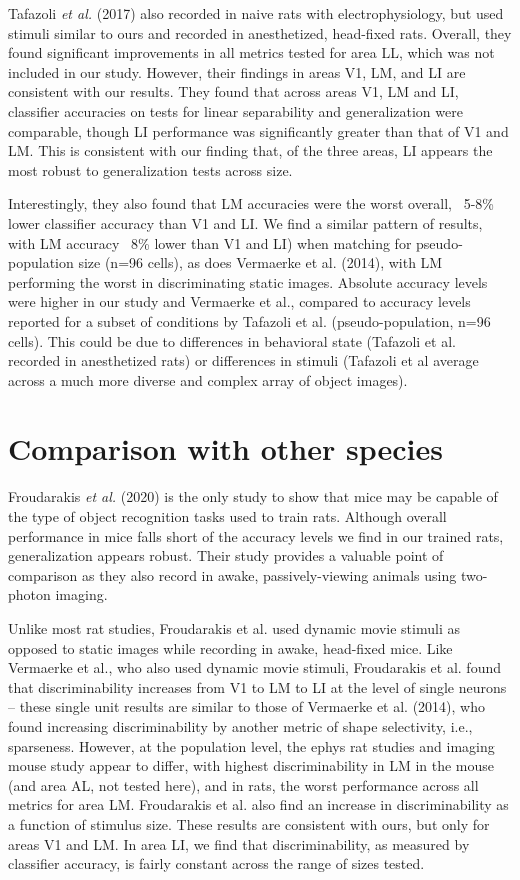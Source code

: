 Tafazoli \textit{et al.} (2017) also recorded in naive rats with electrophysiology, but used stimuli similar to ours and recorded in anesthetized, head-fixed rats. Overall, they found significant improvements in all metrics tested for area LL, which was not included in our study. However, their findings in areas V1, LM, and LI are consistent with our results. They found that across areas V1, LM and LI, classifier accuracies on tests for linear separability and generalization were comparable, though LI performance was significantly greater than that of V1 and LM. This is consistent with our finding that, of the three areas, LI appears the most robust to generalization tests across size.

Interestingly, they also found that LM accuracies were the worst overall, ~5-8\% lower classifier accuracy than V1 and LI. We find a similar pattern of results, with LM accuracy ~8\% lower than V1 and LI) when matching for pseudo-population size (n=96 cells), as does Vermaerke et al. (2014), with LM performing the worst in discriminating static images. Absolute accuracy levels were higher in our study and Vermaerke et al., compared to accuracy levels reported for a subset of conditions by Tafazoli et al. (pseudo-population, n=96 cells). This could be due to differences in behavioral state (Tafazoli et al. recorded in anesthetized rats) or differences in stimuli (Tafazoli et al average across a much more diverse and complex array of object images). 

\section{Comparison with other species}
Froudarakis \textit{et al.} (2020) is the only study to show that mice may be capable of the type of object recognition tasks used to train rats. Although overall performance in mice falls short of the accuracy levels we find in our trained rats, generalization appears robust. Their study provides a valuable point of comparison as they also record in awake, passively-viewing animals using two-photon imaging.

Unlike most rat studies, Froudarakis et al. used dynamic movie stimuli as opposed to static images while recording in awake, head-fixed mice. Like Vermaerke et al., who also used dynamic movie stimuli, Froudarakis et al. found that discriminability increases from V1 to LM to LI at the level of single neurons -- these single unit results are similar to those of Vermaerke et al. (2014), who found increasing discriminability by another metric of shape selectivity, i.e., sparseness. However, at the population level, the ephys rat studies and imaging mouse study appear to differ, with highest discriminability in LM in the mouse (and area AL, not tested here), and in rats, the worst performance across all metrics for area LM. Froudarakis et al. also find an increase in discriminability as a function of stimulus size. These results are consistent with ours, but only for areas V1 and LM. In area LI, we find that discriminability, as measured by classifier accuracy, is fairly constant across the range of sizes tested. 

